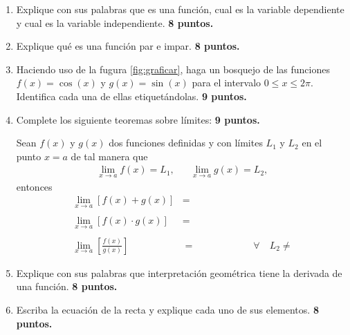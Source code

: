 \documentclass[]{article}
\begin{document}
\begin{enumerate}
\item Explique con sus palabras que es una funci\'on, cual es
la variable dependiente y cual es la variable independiente.
\hfill \textbf{8 puntos.}


\item Explique qu\'e es una funci\'on par e impar.
\hfill \textbf{8 puntos.}



\item Haciendo uso de la fugura \ref{fig:graficar}, haga un bosquejo de las
funciones $f(x)=\cos(x)$ y $g(x)=\sin(x)$ para el intervalo $0 \leq x \leq
2\pi$. Identifica cada una de ellas etiquet\'andolas.
\hfill \textbf{9 puntos.}

\item Complete los siguiente teoremas sobre l\'imites:
\hfill \textbf{9 puntos.}

Sean $f(x)$ y $g(x)$ dos funciones definidas y con l\'imites $L_{1}$ y $L_{2}$
en el punto $x=a$ de tal manera que 
\begin{align*}
\lim_{x \to a} f(x) = L_{1}, && \lim_{x \to a} g(x) = L_{2},
\end{align*}
entonces
\begin{align}
\lim_{x \to a} [f(x) + g(x)]     &=    \\ \nonumber \\
\lim_{x \to a} [f(x) \cdot g(x)] &=   \\ \nonumber \\
\lim_{x \to a} \left[\frac{f(x)}{g(x)}\right] &=  \qquad \qquad \qquad \forall \quad L_{2} \neq 
\end{align}
\setcounter{equation}{0}

\item Explique con sus palabras que interpretaci\'on geom\'etrica tiene la
derivada de una funci\'on.
\hfill \textbf{8 puntos.}

\item Escriba la ecuaci\'on de la recta y explique cada uno de sus elementos.
\hfill \textbf{8 puntos.}

\end{enumerate}
\end{document}
